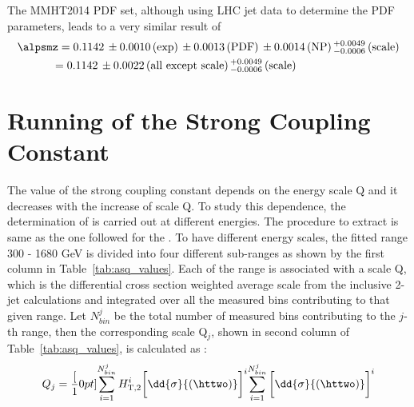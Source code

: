 The MMHT2014 PDF set, although using LHC jet data to determine the PDF parameters, leads to a very similar result of
\begin{equation}
\begin{gathered}
  \alpsmz = 0.1142\,\pm0.0010\,\textrm{(exp)}\,\pm0.0013\,\textrm{(PDF)}\,\pm0.0014\,\textrm{(NP)}\,^{+0.0049}_{-0.0006}\,\textrm{(scale)}\\
  \hspace*{-20mm} = 0.1142\,\pm0.0022\,\textrm{(all except scale)}\,^{+0.0049}_{-0.0006}\,\textrm{(scale)}\,
\end{gathered}
\end{equation}

\section{Running of the Strong Coupling Constant}
The value of the strong coupling constant \alps depends on the energy scale Q and it decreases with the increase of scale Q. To study this dependence, the determination of \alps is carried out at different energies. The procedure to extract \alpsq is same as the one followed for the \alpsmz. To have different energy scales, the fitted \httwo range 300 - 1680 GeV is divided into four different sub-ranges as shown by the first column in Table~\ref{tab:asq_values}. Each of the \httwo range is associated with a scale Q, which is the differential cross section weighted average \httwo scale from the inclusive 2-jet calculations and integrated over all the measured \httwo bins contributing to that given \httwo range. Let $N^{j}_{bin}$ be the total number of measured \httwo bins contributing to the $j$-th \httwo range, then the corresponding scale Q$_{j}$, shown in second column of Table~\ref{tab:asq_values}, is calculated as :
\begin{equation}
Q_{j} = \frac[10pt]{\sum\limits_{i=1}^{N^{j}_{bin}} H^{i}_{\rm T,2} \bigg[{\dd{\sigma}{(\httwo)}}\bigg]^{i}}{\sum\limits_{i=1}^{N^{j}_{bin}} \bigg[{\dd{\sigma}{(\httwo)}}\bigg]^{i}}
\end{equation}

